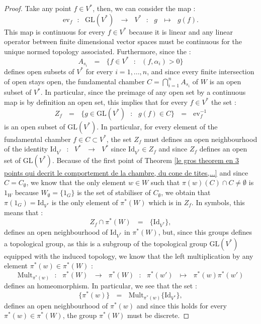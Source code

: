 \documentclass[envcountsame,envcountchap]{svmono}
\newcommand{\es}{\emptyset}
\newcommand{\sub}{\subset}
\newcommand{\bcap}[2]{\bigcap\limits_{#1}^{#2}}
\newcommand{\fct}[4]{\qq:\qq #1\qq\longrightarrow\qq #2\qq :\qq #3\qq \mapsto\qq #4}
\newcommand{\qq}{\text{ }}
\newcommand{\fctt}[2]{\qq:\qq#1\qq\rightarrow\qq#2}
\begin{document}
\begin{proof}
	Take any point $f\in V^*$, then, we can consider the map :
	\begin{equation}
	\mbox{ev}_f\fct{\mbox{GL}(V^*)}{V^*}{g}{g(f)}.
	\end{equation}
	This map is continuous for every $f\in V^*$ because it is linear and any linear operator between finite dimensional vector spaces must be continuous for the unique normed topology associated. Furthermore, since the :
	\begin{equation}
	A_{s_i}\qq=\qq \{f\in V^*\qq :\qq (f,\alpha_i)>0\}
	\end{equation}
	defines open subsets of $V^*$ for every $i=1,...,n$, and since every finite intersection of open stays open, the fundamental chamber $C=\bcap{i=1}{n}A_{s_i}$ of $W$ is an open subset of $V^*$. In particular, since the preimage of any open set by a continuous map is by definition an open set, this implies that for every $f\in V^*$ the set :
	\begin{equation}
	Z_f\qq=\qq \{g\in \mbox{GL}(V^*)\qq:\qq g(f)\in C\}\qq=\qq \mbox{ev}_f^{-1}
	\end{equation}
	is an open subset of $\mbox{GL}(V^*)$. In particular, for every element of the fundamental chamber $f \in C\sub V^*$, the set $Z_f$ must defines an open neighbourhood of the identity $\mbox{Id}_{V^*}\fctt{V^*}{V^*}$ since $\mbox{Id}_{V^*}\in Z_f$ and since $Z_f$ defines an open set of $\mbox{GL}(V^*)$. Because of the first point of Theorem \ref{le gros theorem en 3 points qui decrit le comportement de la chambre, du cone de tites,...} and since $C=C_\es$, we know that the only element $w\in W$ such that $\pi(w)(C)\cap C\not=\es$ is $1_W$ because $W_\es=\{1_G\}$ is the set of stabiliser of $C_\es$, we obtain that $\pi(1_G)=\mbox{Id}_{V^*}$ is the only element of $\pi^*(W)$ which is in $Z_f$. In symbols, this means that :
	\begin{equation}
	Z_f\cap \pi^*(W)\qq=\qq \{\mbox{Id}_{V^*}\},
	\end{equation}
	defines an open neighbourhood of $\mbox{Id}_{V^*}$ in $\pi^*(W)$, but, since this groups defines a topological group, as this is a subgroup of the topological group $\mbox{GL}(V^*)$ equipped with the induced topology, we know that the left multiplication by any element $\pi^*(w)\in \pi^*(W)$ :
	\begin{equation}
	\mbox{Mult}_{\pi^*(w)}\fct{\pi^*(W)}{\pi^*(W)}{\pi^*(w')}{\pi^*(w)\pi^*(w')}
	\end{equation}
	defines an homeomorphism. In particular, we see that the set :
	\begin{equation}
	\{\pi^*(w)\}\qq=\qq \mbox{Mult}_{\pi^*(w)}\{\mbox{Id}_{V^*}\},
	\end{equation}
	defines an open neighbourhood of $\pi^*(w)$ and since this holds for every ${\pi^*(w)}\in \pi^*(W)$, the group $\pi^*(W)$ must be discrete.
\end{proof}
\end{document}
